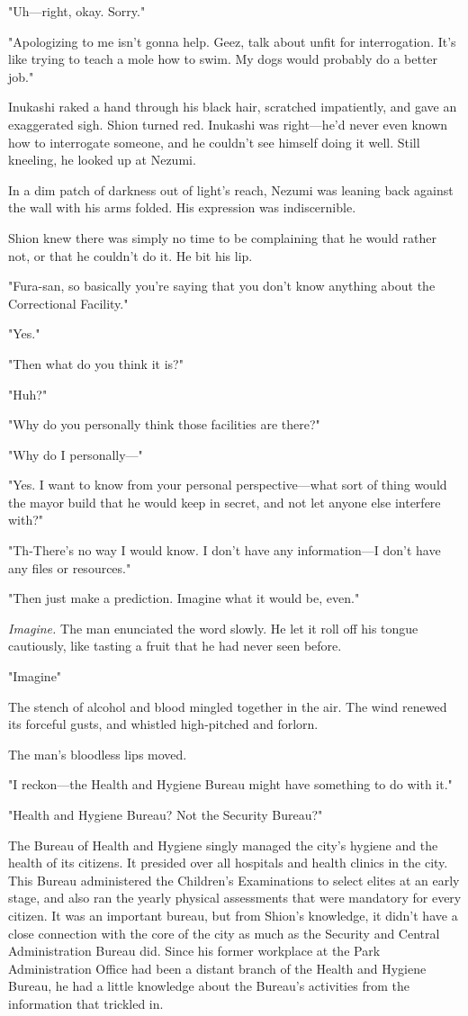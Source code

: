 "Uh---right, okay. Sorry."

"Apologizing to me isn't gonna help. Geez, talk about unfit for
interrogation. It's like trying to teach a mole how to swim. My dogs
would probably do a better job."

Inukashi raked a hand through his black hair, scratched impatiently, and
gave an exaggerated sigh. Shion turned red. Inukashi was right---he'd
never even known how to interrogate someone, and he couldn't see himself
doing it well. Still kneeling, he looked up at Nezumi.

In a dim patch of darkness out of light's reach, Nezumi was leaning back
against the wall with his arms folded. His expression was indiscernible.

Shion knew there was simply no time to be complaining that he would
rather not, or that he couldn't do it. He bit his lip.

"Fura-san, so basically you're saying that you don't know anything about
the Correctional Facility."

"Yes."

"Then what do you think it is?"

"Huh?"

"Why do you personally think those facilities are there?"

"Why do I personally---"

"Yes. I want to know from your personal perspective---what sort of thing
would the mayor build that he would keep in secret, and not let anyone
else interfere with?"

"Th-There's no way I would know. I don't have any information---I don't
have any files or resources."

"Then just make a prediction. Imagine what it would be, even."

\emph{Imagine.} The man enunciated the word slowly. He let it roll off his
tongue cautiously, like tasting a fruit that he had never seen before.

"Imagine\el "

The stench of alcohol and blood mingled together in the air. The wind
renewed its forceful gusts, and whistled high-pitched and forlorn.

The man's bloodless lips moved.

"I reckon---the Health and Hygiene Bureau might have something to do with
it."

"Health and Hygiene Bureau? Not the Security Bureau?"

The Bureau of Health and Hygiene singly managed the city's hygiene and
the health of its citizens. It presided over all hospitals and health
clinics in the city. This Bureau administered the Children's
Examinations to select elites at an early stage, and also ran the yearly
physical assessments that were mandatory for every citizen. It was an
important bureau, but from Shion's knowledge, it didn't have a close
connection with the core of the city as much as the Security and Central
Administration Bureau did. Since his former workplace at the Park
Administration Office had been a distant branch of the Health and
Hygiene Bureau, he had a little knowledge about the Bureau's activities
from the information that trickled in.

